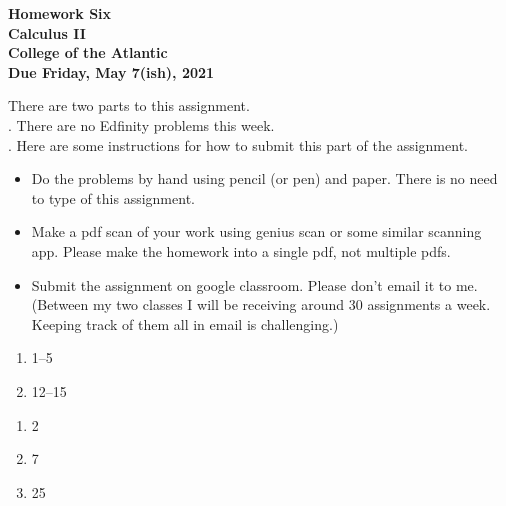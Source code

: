 \documentclass[12pt]{article}
\begin{document}
\pagestyle{empty}
 
\begin{center}
{\LARGE {\bf Homework Six}}\\
\bigskip
{\Large {\bf Calculus II}}\\
\bigskip
{\Large {\bf College of the Atlantic}}\\
\bigskip
{ {\bf Due Friday, May 7(ish), 2021}}\\ 
\end{center}
\medskip


\noindent There are two parts to this assignment.\\

. There are no Edfinity problems
this week.\\

.  Here are some
instructions for how to submit this part of the assignment.
\begin{itemize}
\item Do the problems by hand using pencil (or pen) and paper.
  There is no need to type of this assignment.
\item Make a pdf scan of your work using genius scan or some
  similar scanning app.  Please make the homework into a single
  pdf, not multiple pdfs.
\item Submit the assignment on google classroom.  Please don't
  email it to me.  (Between my two classes I will be receiving
  around 30 assignments a week.  Keeping track of them all in email
  is challenging.)
\end{itemize}


\begin{enumerate}
\setlength{\itemsep}{-1mm}
\item 1--5
\item 12--15
\end{enumerate}



\begin{enumerate}
\setlength{\itemsep}{-1mm}
\item 2
\item 7
\item 25
\end{enumerate}
\end{document}
